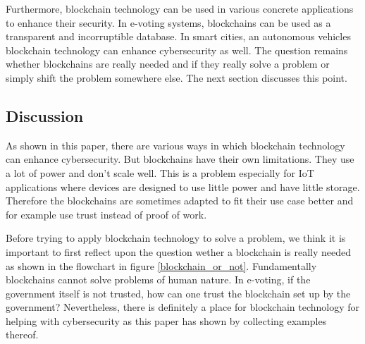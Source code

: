 Furthermore, blockchain technology can be used in various concrete applications to enhance their security.
In e-voting systems, blockchains can be used as a transparent and incorruptible database.
In smart cities, an autonomous vehicles blockchain technology can enhance cybersecurity as well.
The question remains whether blockchains are really needed and if they really solve a problem or simply shift the problem somewhere else. The next section discusses this point.

\subsection{Discussion}

As shown in this paper, there are various ways in which blockchain technology can enhance cybersecurity.
But blockchains have their own limitations. They use a lot of power and don't scale well. This is a problem especially for IoT applications where devices are designed to use little power and have little storage. Therefore the blockchains are sometimes adapted to fit their use case better and for example use trust instead of proof of work.

Before trying to apply blockchain technology to solve a problem, we think it is important to first reflect upon the question wether a blockchain is really needed as shown in the flowchart in figure \ref{blockchain_or_not}.
Fundamentally blockchains cannot solve problems of human nature. In e-voting, if the government itself is not trusted, how can one trust the blockchain set up by the government? Nevertheless, there is definitely a place for blockchain technology for helping with cybersecurity as this paper has shown by collecting examples thereof.








